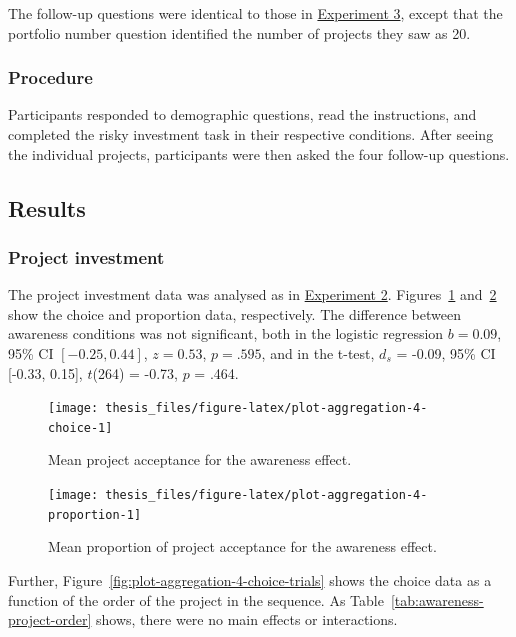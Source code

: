 \documentclass[a4paper, nobind, dvipsnames]{templates/ociamthesis}
\theoremstyle{definition}
\theoremstyle{definition}
\theoremstyle{definition}
\theoremstyle{definition}
\theoremstyle{remark}
\begin{document}
The follow-up questions were identical to those in
\protect\hyperlink{follow-up-aggregation-3}{Experiment 3}, except that the portfolio number
question identified the number of projects they saw as 20.

\subsubsection{Procedure}

Participants responded to demographic questions, read the instructions, and
completed the risky investment task in their respective conditions. After seeing
the individual projects, participants were then asked the four follow-up
questions.

\subsection{Results}

\subsubsection{Project investment}

The project investment data was analysed as in
\protect\hyperlink{results-aggregation-2}{Experiment 2}.
Figures~\ref{fig:plot-aggregation-4-choice}
and~\ref{fig:plot-aggregation-4-proportion} show the choice and proportion
data, respectively. The difference between
awareness conditions was not significant, both in the logistic regression
\(b = 0.09\), 95\% CI \([-0.25, 0.44]\), \(z = 0.53\), \(p = .595\), and in the t-test,
\(d_s\) = -0.09, 95\% CI {[}-0.33, 0.15{]}, \(t\)(264) = -0.73, \(p\) = .464.



\begin{figure}
\texttt{[image: thesis\_files/figure-latex/plot-aggregation-4-choice-1]} \caption{Mean project acceptance for the awareness effect.}\label{fig:plot-aggregation-4-choice}
\end{figure}



\begin{figure}
\texttt{[image: thesis\_files/figure-latex/plot-aggregation-4-proportion-1]} \caption{Mean proportion of project acceptance for the awareness effect.}\label{fig:plot-aggregation-4-proportion}
\end{figure}

Further, Figure~\ref{fig:plot-aggregation-4-choice-trials} shows the choice
data as a function of the order of the project in the sequence. As
Table~\ref{tab:awareness-project-order} shows, there were no main effects or
interactions.
\end{document}
